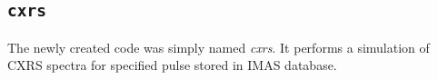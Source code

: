 \documentclass[../main.tex]{subfiles}
\begin{document}
\subsection{\texttt{cxrs}}

The newly created code was simply named \emph{cxrs}. It performs a simulation of CXRS spectra for specified pulse stored in IMAS database.
\end{document}
